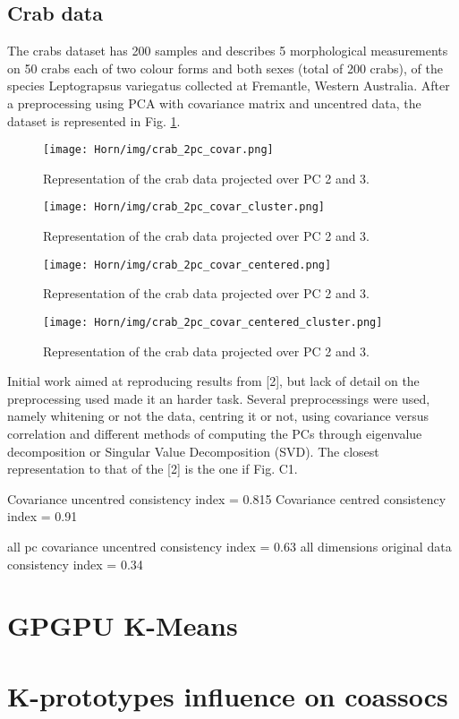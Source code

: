 \subsection{Crab data}


The crabs dataset has 200 samples and describes 5 morphological measurements on 50 crabs each of two colour forms and both sexes (total of 200 crabs), of the species Leptograpsus variegatus collected at Fremantle, Western Australia. After a preprocessing using PCA with covariance matrix and uncentred data, the dataset is represented in Fig. \ref{fig:crab_2pc_covar}.%

\begin{figure}[hbtp]
\centering
\texttt{[image: Horn/img/crab\_2pc\_covar.png]}
\caption{Representation of the crab data projected over PC 2 and 3.}
\label{fig:crab_2pc_covar}
\end{figure}

\begin{figure}[hbtp]
\centering
\texttt{[image: Horn/img/crab\_2pc\_covar\_cluster.png]}
\caption{Representation of the crab data projected over PC 2 and 3.}
\label{fig:crab_2pc_covar_cluster}
\end{figure}

\begin{figure}[hbtp]
\centering
\texttt{[image: Horn/img/crab\_2pc\_covar\_centered.png]}
\caption{Representation of the crab data projected over PC 2 and 3.}
\label{fig:crab_2pc_covar_centered}
\end{figure}

\begin{figure}[hbtp]
\centering
\texttt{[image: Horn/img/crab\_2pc\_covar\_centered\_cluster.png]}
\caption{Representation of the crab data projected over PC 2 and 3.}
\label{fig:crab_2pc_covar_centered_cluster}
\end{figure}


Initial work aimed at reproducing results from [2], but lack of detail on the preprocessing used made it an harder task. Several preprocessings were used, namely whitening or not the data, centring it or not, using covariance versus correlation and different methods of computing the PCs through eigenvalue decomposition or Singular Value Decomposition (SVD). The closest representation to that of the [2] is the one if Fig. C1.



Covariance uncentred consistency index = 0.815
Covariance centred consistency index = 0.91

all pc covariance uncentred consistency index = 0.63
all dimensions original data consistency index = 0.34


\section{GPGPU K-Means}

\section{K-prototypes influence on coassocs}